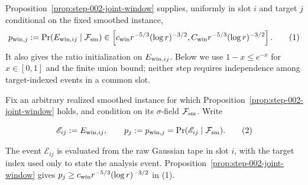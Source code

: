 Proposition~\ref{prop:step-002-joint-window} supplies, uniformly in slot
$i$ and target $j$ conditional on the fixed smoothed instance,
\[
p_{{\rm win},j}:=
\Pr(E_{{\rm win},ij}\mid\mathcal F_{\rm sm})
\in\left[c_{\rm win}r^{-5/3}(\log r)^{-3/2},
C_{\rm win}r^{-5/3}(\log r)^{-3/2}\right].
\tag{1}
\]
It also gives the ratio initialization on $E_{{\rm win},ij}$. Below we use
$1-x\le e^{-x}$ for $x\in[0,1]$ and the finite union bound; neither step
requires independence among target-indexed events in a common slot.

Fix an arbitrary realized smoothed instance for which
Proposition~\ref{prop:step-002-joint-window} holds, and condition on its
$\sigma$-field $\mathcal F_{\rm sm}$. Write

\[
\mathscr E_{ij}:=E_{{\rm win},ij},\qquad
p_j:=p_{{\rm win},j}=\Pr(\mathscr E_{ij}\mid\mathcal F_{\rm sm}).
\tag{2}
\]

The event \(\mathscr E_{ij}\) is evaluated from the raw Gaussian tape in slot
\(i\), with the target index used only to state the analysis event.
Proposition~\ref{prop:step-002-joint-window} gives
\(p_j\ge c_{\rm win}r^{-5/3}(\log r)^{-3/2}\) in (1).


